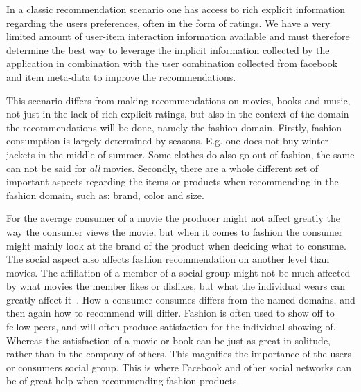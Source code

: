 In a classic recommendation scenario one has access to rich explicit
information regarding the users preferences, often in the form of ratings. We
have a very limited amount of user-item interaction information available and
must therefore determine the best way to leverage the implicit information
collected by the application in combination with the user combination collected
from facebook and item meta-data to improve the recommendations.

This scenario differs from making recommendations on movies, books and music, not just in the lack of rich explicit ratings, but also in the context of the domain the recommendations will be done, namely the fashion domain.
Firstly, fashion consumption is largely determined by seasons.
E.g. one does not buy winter jackets in the middle of summer.  Some clothes do
also go out of fashion, the same can not be said for \emph{all} movies. Secondly, there are a whole different set of important aspects regarding the items or products
when recommending in the fashion domain, such as: brand, color and size.

For the average consumer of a movie the producer might not affect greatly the
way the consumer views the movie, but when it comes to fashion the consumer
might mainly look at the brand of the product when deciding what to consume.
The social aspect also affects fashion recommendation on another level than
movies.
The affiliation of a member of a social group might not be much affected by
what movies the member likes or dislikes, but what the individual wears can
greatly affect it~\cite{vignali2009fashion}.
How a consumer consumes differs from the named domains, and then again how to
recommend will differ.  Fashion is often used to show off to fellow peers, and
will often produce satisfaction for the individual showing of.
Whereas the satisfaction of a movie or book can be just as great in solitude,
rather than in the company of others.  This magnifies the importance of the
users or consumers social group.  This is where Facebook and other social
networks can be of great help when recommending fashion products.


